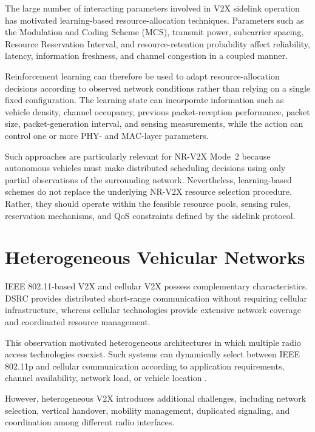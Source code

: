 The large number of interacting parameters involved in V2X sidelink
operation has motivated learning-based resource-allocation techniques.
Parameters such as the Modulation and Coding Scheme (MCS), transmit power,
subcarrier spacing, Resource Reservation Interval, and resource-retention
probability affect reliability, latency, information freshness, and channel
congestion in a coupled manner.

Reinforcement learning can therefore be used to adapt resource-allocation
decisions according to observed network conditions rather than relying on a
single fixed configuration. The learning state can incorporate information
such as vehicle density, channel occupancy, previous packet-reception
performance, packet size, packet-generation interval, and sensing
measurements, while the action can control one or more PHY- and MAC-layer
parameters.

Such approaches are particularly relevant for NR-V2X Mode~2 because
autonomous vehicles must make distributed scheduling decisions using only
partial observations of the surrounding network. Nevertheless,
learning-based schemes do not replace the underlying NR-V2X resource
selection procedure. Rather, they should operate within the feasible
resource pools, sensing rules, reservation mechanisms, and QoS constraints
defined by the sidelink protocol.

\section{Heterogeneous Vehicular Networks}
\label{sec:heterogeneous_v2x}

IEEE 802.11-based V2X and cellular V2X possess complementary characteristics.
DSRC provides distributed short-range communication without requiring
cellular infrastructure, whereas cellular technologies provide extensive
network coverage and coordinated resource management.

This observation motivated heterogeneous architectures in which multiple
radio access technologies coexist. Such systems can dynamically select
between IEEE 802.11p and cellular communication according to application
requirements, channel availability, network load, or vehicle location
\cite{abboud2016interworking,ucar2016hybrid}.

However, heterogeneous V2X introduces additional challenges, including
network selection, vertical handover, mobility management, duplicated
signaling, and coordination among different radio interfaces.

